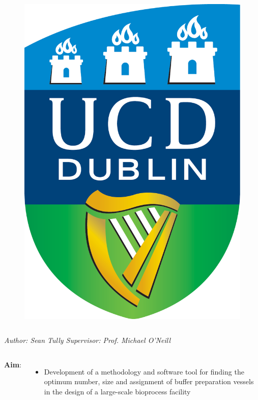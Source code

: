 \documentclass{beamer}
\begin{document}
\begin{frame}
\begin{columns}
\begin{figure}
                \includegraphics[angle=0,scale=0.03]{ucd_logo.png}
            \end{figure}
    \end{columns}
    \centering \small \emph{Author: Sean Tully \quad Supervisor: Prof. Michael
        O'Neill}\par
    \begin{columns}
            \scriptsize \textbf{Aim}:
            \begin{itemize}
                \item  Development of a methodology and software tool
                for finding the optimum number, size and assignment of buffer
                preparation vessels in the design of a large-scale bioprocess
                facility

\end{itemize}
\end{columns}
\end{frame}
\end{document}

